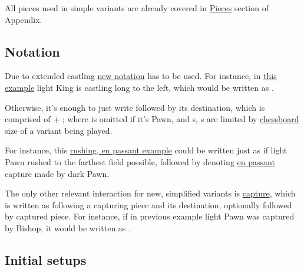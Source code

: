 
All pieces used in simple variants are already covered in
\hyperref[sec:Appendix/Introduction/Pieces]{Pieces} section of Appendix.

\clearpage %

\subsection*{Notation}
\label{sec:Simple variants/Summary/Notation}

Due to extended castling \hyperref[sec:Appendix/Notation/Castling]{new notation}
has to be used. For instance, in
\hyperref[fig:classic14_castling_left_00_05]{this example} light King is
castling long to the left, which would be written as .

Otherwise, it's enough to just write  followed by its destination,
which is comprised of  + ; where  is
omitted if it's Pawn, and s, s are limited by
\hyperref[tbl:Simple variants/Summary/Chessboards]{chessboard} size of a variant
being played.

For instance, this
\hyperref[fig:24_classic14_en_passant]{rushing, en passant example} could
be written just as  if light Pawn rushed to the farthest field
possible, followed by  denoting
\hyperref[sec:Appendix/Notation/En passant]{en passant} capture made by dark Pawn.

The only other relevant interaction for new, simplified variants is
\hyperref[sec:Appendix/Notation/Capturing]{capture}, which is written as \alg{*}
following a capturing piece and its destination, optionally followed by captured
piece. For instance, if in previous example light Pawn was captured by Bishop,
it would be written as .

\clearpage %

\subsection*{Initial setups}
\label{sec:Simple variants/Summary/Initial setups}

